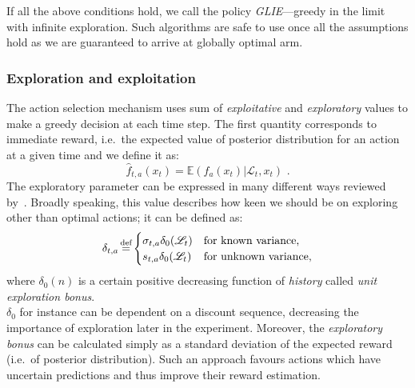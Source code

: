 \documentclass[12pt, a4paper, pdflatex, leqno, twoside]{report}
\newcommand{\myeq}{\stackrel{\mathclap{\normalfont\scriptsize\mbox{def}}}{=}}
\begin{document}
If all the above conditions hold, we call the policy \emph{GLIE}---greedy in the 
limit with infinite exploration. Such algorithms are safe to use once all the assumptions hold as we are guaranteed to arrive at globally optimal arm.\\


\subsubsection{Exploration and exploitation}
The action selection mechanism uses sum of \emph{exploitative} and 
\emph{exploratory} values to make a greedy decision at each time step. The 
first quantity corresponds to immediate reward, i.e.\ the expected value of posterior 
distribution for an action at a given time and we define it as:
\begin{equation}
  \label{eqn:exploitative} \hat{f}_{t,a} (x_t) = \mathbb{E} ( f_a(x_t) | 
\mathscr{L}_t, x_t ) \text{ .}
\end{equation}
The exploratory parameter can be expressed in many different ways reviewed 
by~\citep{meuleau:exploration}. Broadly speaking, this value describes how keen 
we should be on exploring other than optimal actions; it can be defined as:
$$
  \delta_{t,a} \myeq
    \begin{cases}
     \sigma_{t,a} \delta_0(\mathscr{L}_t) & \text{for known variance,}\\
     s_{t,a}      \delta_0(\mathscr{L}_t) & \text{for unknown variance,}
    \end{cases}
$$
where $\delta_0(n)$ is a certain positive decreasing function of \emph{history} 
called \emph{unit exploration bonus}.\\

$\delta_0$ for instance can be dependent on a discount sequence, decreasing the 
importance of exploration later in the experiment. Moreover, the \emph{exploratory bonus} can 
be calculated simply as a standard deviation of the expected reward (i.e.\ of posterior 
distribution). Such an approach favours actions which have uncertain predictions and thus improve their reward estimation.\\
\end{document}
